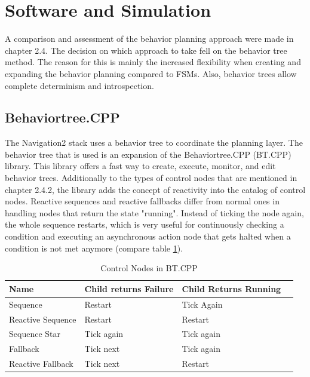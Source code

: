 \section{Software and Simulation}
A comparison and assessment of the behavior planning approach were made in chapter 2.4. The decision on which approach to take fell on the behavior tree method. The reason for this is mainly the increased flexibility when creating and expanding the behavior planning compared to FSMs. Also, behavior trees allow complete determinism and introspection.

\subsection{Behaviortree.CPP}
The Navigation2 stack uses a behavior tree to coordinate the planning layer. The behavior tree that is used is an expansion of the Behaviortree.CPP (BT.CPP) library. This library offers a fast way to create, execute, monitor, and edit behavior trees. 
Additionally to the types of control nodes that are mentioned in chapter 2.4.2, the library adds the concept of reactivity into the catalog of control nodes. Reactive sequences and reactive fallbacks differ from normal ones in handling nodes that return the state "running". Instead of ticking the node again, the whole sequence restarts, which is very useful for continuously checking a condition and executing an asynchronous action node that gets halted when a condition is not met anymore (compare table \ref{tab:control_nodes_bt}). 

\begin{table}[ht]
	\caption{Control Nodes in BT.CPP}
	\label{tab:control_nodes_bt}
	\begin{tabular}{ | m{} | m{}| m{} | m{} |} 
  	\hline
  	\textbf{Name }& \textbf{Child returns Failure} & \textbf{Child Returns Running} \\ 
  	\hline
  	Sequence & Restart & Tick Again\\ 
  	\hline
  	Reactive Sequence & Restart & Restart \\ 
  	\hline
  	Sequence Star & Tick again & Tick again \\
  	\hline
  	Fallback & Tick next & Tick again\\
  	\hline  	
  	Reactive Fallback & Tick next & Restart \\
  	\hline
	\end{tabular}
\end{table}

